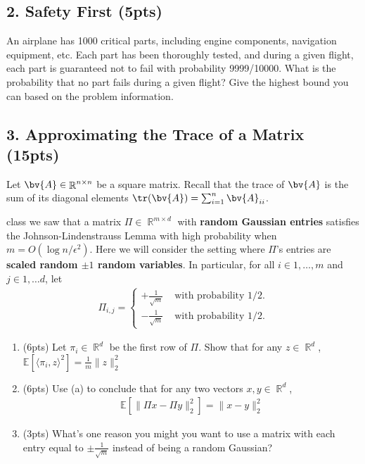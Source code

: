 \documentclass[10pt]{article}
\DeclareMathOperator{\R}{\mathbb{R}}
\newcommand{\E}{\mathbb{E}}
\begin{document}
\subsection{2. Safety First (\textbf{\small 5pts})}
An airplane has 1000 critical parts, including engine components, navigation equipment, etc. Each part has been thoroughly tested, and during a given flight, each part is guaranteed not to fail with probability 9999/10000. 
What is the probability that no part fails during a given flight? Give the highest bound you can based on the problem information. 

\vspace{10em}

\newpage

\subsection{3. Approximating the Trace of a Matrix (\textbf{\small 15pts})}
Let $\bv{A}\in \R^{n\times n}$ be a square matrix. Recall that the trace of $\bv{A}$ is the sum of its diagonal elements $\tr(\bv{A}) = \sum_{i=1}^n \bv{A}_{ii}$. 

 class we saw that a matrix ${\Pi} \in\R^{m \times d}$ with \textbf{random Gaussian entries} satisfies the Johnson-Lindenstrauss Lemma with high probability when $m = {O(\log n /\epsilon^2)}$. Here we will consider the setting where $\Pi$'s entries are \textbf{scaled random $\pm 1$ random variables}. In particular, for all $i \in 1,\ldots, m$ and $j \in 1,\ldots d$, let 
\begin{align*}
	\Pi_{i,j} = \begin{cases}
		+\frac{1}{\sqrt{m}} & \text{ with probability $1/2$.} \\
		-\frac{1}{\sqrt{m}} & \text{ with probability $1/2$.} 
	\end{cases}
\end{align*}

\begin{enumerate}[label=(\alph*)]
	\item (6pts) Let $\pi_i \in \R^d$ be the first row of $\Pi$. Show that for any $z \in \R^d$, $\E[ \langle\pi_i, z\rangle^2] = \frac{1}{m}\|z\|_2^2$
	\vspace{14em}
	
	\item (6pts) Use (a) to conclude that for any two vectors $x,y \in \R^d$, 
	\begin{align*}
		\E[\|\Pi x - \Pi y\|_2^2] = \|x - y\|_2^2
	\end{align*}
	\vspace{12em}
	
	
	\item (3pts) What's one reason you might you want to use a matrix with each entry equal to $\pm\frac{1}{\sqrt{m}}$ instead of being a random Gaussian?
	\vspace{3em}
\end{enumerate}
\end{document}
